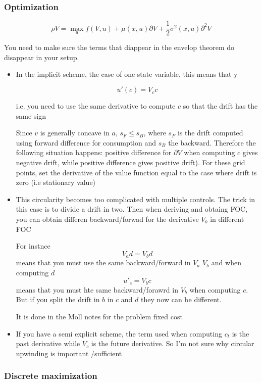\documentclass[english]{article}
\begin{document}
\subsubsection{Optimization}
$$\rho V = \max_u f(V, u) + \mu(x, u) \partial V + \frac{1}{2}\sigma^2(x, u) \partial^2V$$ 


You need to make sure the terms that diappear in the envelop theorem do disappear in your setup.

\begin{itemize}
	\item In the implicit scheme, the case of one state variable, this means that y

	$$u'(c) = V_c c$$

	i.e. you need to use the same derivative to compute $c$ so that the drift has the same sign

	Since $v$ is generally concave in $a$, $s_F \leq s_B$, where $s_F$ is the drift computed using forward difference for consumption and $s_B$ the backward. Therefore the following situation happens: positive difference for $\partial V$ when computing $c$ gives negative drift, while positive difference gives positive drift). For these grid points, set the derivative of the value function equal to the case where drift is zero (i.e stationary value)


	\item This circularity becomes too complicated with multiple controls.
	The trick in this case is to divide a drift in two. Then when deriving and obtaing FOC, you can obtain differen backward/forwad for the derivative $V_b$ in different FOC 

	For instnce
		$$V_a d = V_b d$$
		means that you must use the same backward/forward in $V_a$ $V_b$ and when computing $d$
		$$u'_c = V_b c$$
		means that you must hte same backward/forawrd in $V_b$ when computing $c$. But if you split the drift in $b$ in $c$ and $d$ they now can be different.


		It is done in the Moll notes for the problem fixed cost

	\item If you have a semi explicit scheme, the term used when computing $c_t$ is the past derivative while $V_c$ is the future derivative. So I'm not sure why circular upwinding is important /sufficient
\end{itemize}

\subsubsection{Discrete maximization}
\end{document}
